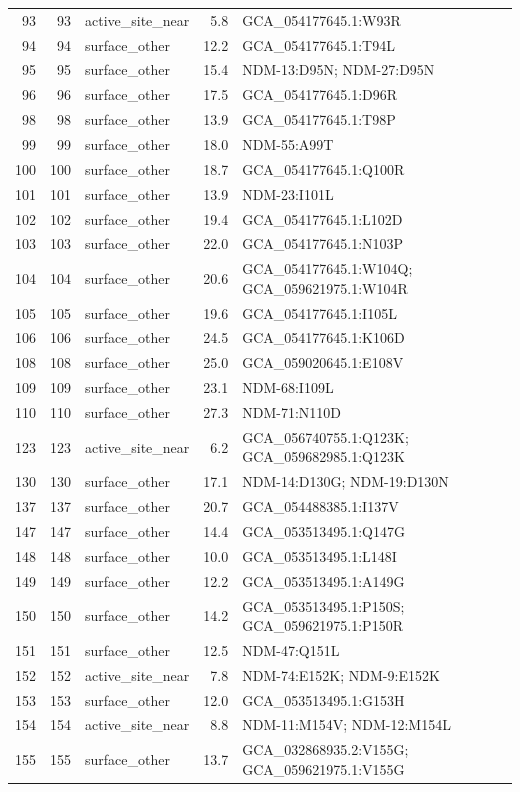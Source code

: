 \begin{longtable}{rrlrl}
93&93&active\_site\_near&5.8&GCA\_054177645.1:W93R\\
94&94&surface\_other&12.2&GCA\_054177645.1:T94L\\
95&95&surface\_other&15.4&NDM-13:D95N; NDM-27:D95N\\
96&96&surface\_other&17.5&GCA\_054177645.1:D96R\\
98&98&surface\_other&13.9&GCA\_054177645.1:T98P\\
99&99&surface\_other&18.0&NDM-55:A99T\\
100&100&surface\_other&18.7&GCA\_054177645.1:Q100R\\
101&101&surface\_other&13.9&NDM-23:I101L\\
102&102&surface\_other&19.4&GCA\_054177645.1:L102D\\
103&103&surface\_other&22.0&GCA\_054177645.1:N103P\\
104&104&surface\_other&20.6&GCA\_054177645.1:W104Q; GCA\_059621975.1:W104R\\
105&105&surface\_other&19.6&GCA\_054177645.1:I105L\\
106&106&surface\_other&24.5&GCA\_054177645.1:K106D\\
108&108&surface\_other&25.0&GCA\_059020645.1:E108V\\
109&109&surface\_other&23.1&NDM-68:I109L\\
110&110&surface\_other&27.3&NDM-71:N110D\\
123&123&active\_site\_near&6.2&GCA\_056740755.1:Q123K; GCA\_059682985.1:Q123K\\
130&130&surface\_other&17.1&NDM-14:D130G; NDM-19:D130N\\
137&137&surface\_other&20.7&GCA\_054488385.1:I137V\\
147&147&surface\_other&14.4&GCA\_053513495.1:Q147G\\
148&148&surface\_other&10.0&GCA\_053513495.1:L148I\\
149&149&surface\_other&12.2&GCA\_053513495.1:A149G\\
150&150&surface\_other&14.2&GCA\_053513495.1:P150S; GCA\_059621975.1:P150R\\
151&151&surface\_other&12.5&NDM-47:Q151L\\
152&152&active\_site\_near&7.8&NDM-74:E152K; NDM-9:E152K\\
153&153&surface\_other&12.0&GCA\_053513495.1:G153H\\
154&154&active\_site\_near&8.8&NDM-11:M154V; NDM-12:M154L\\
155&155&surface\_other&13.7&GCA\_032868935.2:V155G; GCA\_059621975.1:V155G\\

\end{longtable}
